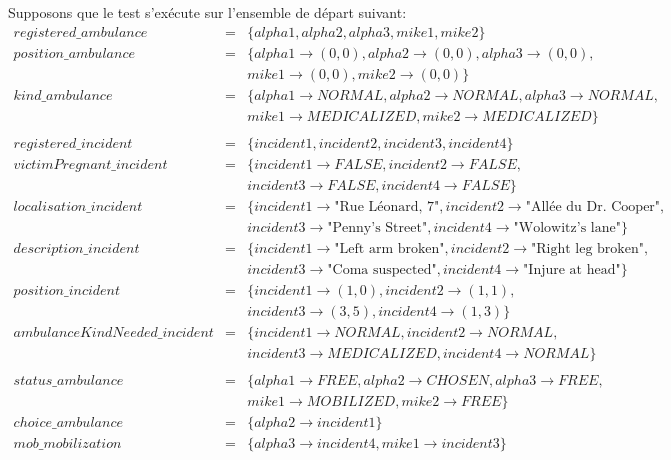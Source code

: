 \documentclass{report}
\begin{document}
Supposons que le test s'exécute sur l'ensemble de départ suivant:
\begin{eqnarray*}
registered\_ambulance &=& \{alpha1, alpha2, alpha3, mike1, mike2\}\\
position\_ambulance &=& \{alpha1 \rightarrow (0,0), alpha2 \rightarrow (0,0), alpha3 \rightarrow (0,0), \\ 
	&& mike1 \rightarrow (0,0), mike2 \rightarrow (0,0)\}\\
kind\_ambulance &=& \{alpha1 \rightarrow NORMAL, alpha2 \rightarrow NORMAL, alpha3 \rightarrow NORMAL, \\ 
	&& mike1 \rightarrow MEDICALIZED, mike2 \rightarrow MEDICALIZED\} \\
\\
registered\_incident &=& \{incident1, incident2, incident3, incident4\}\\
victimPregnant\_incident &=& \{incident1 \rightarrow FALSE, incident2\rightarrow FALSE, \\ 
	&& incident3\rightarrow FALSE, incident4\rightarrow FALSE\}\\
localisation\_incident &=& \{incident1 \rightarrow \text{"Rue Léonard, 7"}, incident2 \rightarrow \text{"Allée du Dr. Cooper"},\\ 
	&&  incident3  \rightarrow \text{"Penny's Street"}, incident4 \rightarrow \text{"Wolowitz's lane"}\}\\
description\_incident &=& \{incident1 \rightarrow \text{"Left arm broken"}, incident2 \rightarrow \text{"Right leg broken"},\\ 
	&&  incident3 \rightarrow \text{"Coma suspected"}, incident4 \rightarrow \text{"Injure at head"}\}\\
position\_incident &=& \{incident1 \rightarrow (1,0), incident2 \rightarrow (1,1),\\ 
	&&  incident3 \rightarrow (3,5), incident4 \rightarrow (1,3)\}\\
ambulanceKindNeeded\_incident &=& \{incident1 \rightarrow NORMAL, incident2 \rightarrow NORMAL, \\ 
	&& incident3 \rightarrow MEDICALIZED, incident4 \rightarrow NORMAL\}\\
\\
status\_ambulance &=& \{alpha1 \rightarrow FREE, alpha2 \rightarrow CHOSEN, alpha3 \rightarrow FREE, \\ 
	&& mike1 \rightarrow MOBILIZED, mike2 \rightarrow FREE\} \\
choice\_ambulance &=& \{alpha2 \rightarrow incident1\} \\
mob\_mobilization &=& \{alpha3 \rightarrow incident4, mike1 \rightarrow incident3\} \\
\end{eqnarray*}
\end{document}
